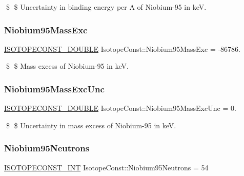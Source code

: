 \$ \$ Uncertainty in binding energy per A of Niobium-\/95 in keV. \mbox{\label{group___isotope_const-_niobium-_nb95_ga0ec82dfed90aa11b264bf7de20e7dbc0}} 
\subsubsection{\texorpdfstring{Niobium95\+Mass\+Exc}{Niobium95MassExc}}
{\footnotesize\ttfamily \mbox{\hyperlink{group___isotope_const-_macros_ga8f45a7272ce02c0b4c65c44636ed719a}{I\+S\+O\+T\+O\+P\+E\+C\+O\+N\+S\+T\+\_\+\+D\+O\+U\+B\+LE}} Isotope\+Const\+::\+Niobium95\+Mass\+Exc = -\/86786.}

\$ \$ Mass excess of Niobium-\/95 in keV. \mbox{\label{group___isotope_const-_niobium-_nb95_ga88b645ccb17e3c88e84bede6dbf0baf0}} 
\subsubsection{\texorpdfstring{Niobium95\+Mass\+Exc\+Unc}{Niobium95MassExcUnc}}
{\footnotesize\ttfamily \mbox{\hyperlink{group___isotope_const-_macros_ga8f45a7272ce02c0b4c65c44636ed719a}{I\+S\+O\+T\+O\+P\+E\+C\+O\+N\+S\+T\+\_\+\+D\+O\+U\+B\+LE}} Isotope\+Const\+::\+Niobium95\+Mass\+Exc\+Unc = 0.}

\$ \$ Uncertainty in mass excess of Niobium-\/95 in keV. \mbox{\label{group___isotope_const-_niobium-_nb95_ga64d9f8c3d858ce76303d45e38ad350b5}} 
\subsubsection{\texorpdfstring{Niobium95\+Neutrons}{Niobium95Neutrons}}
{\footnotesize\ttfamily \mbox{\hyperlink{group___isotope_const-_macros_ga5f18360b3e99483a35c32d789e62621c}{I\+S\+O\+T\+O\+P\+E\+C\+O\+N\+S\+T\+\_\+\+I\+NT}} Isotope\+Const\+::\+Niobium95\+Neutrons = 54}

